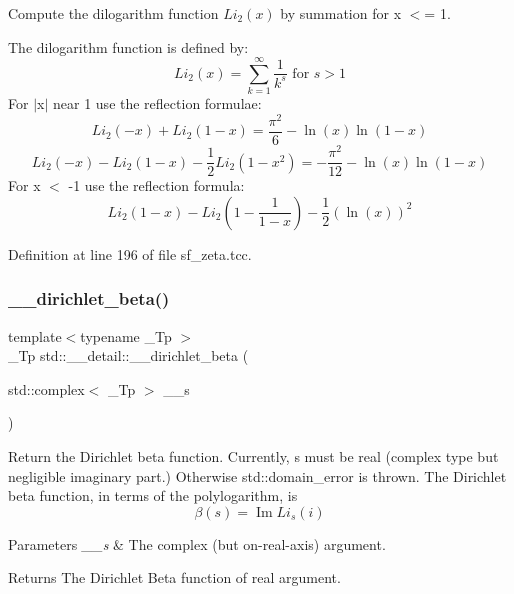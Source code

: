 Compute the dilogarithm function $ Li_2(x) $ by summation for x $<$= 1. 

The dilogarithm function is defined by\+: \[ Li_2(x) = \sum_{k=1}^{\infty} \frac{1}{k^{s}} \mbox{ for } s > 1 \] For $\vert$x$\vert$ near 1 use the reflection formulae\+: \[ Li_2(-x) + Li_2(1-x) = \frac{\pi^2}{6} - \ln(x) \ln(1-x) \] \[ Li_2(-x) - Li_2(1-x) - \frac{1}{2}Li_2(1-x^2) = -\frac{\pi^2}{12} - \ln(x) \ln(1-x) \] For x $<$ -\/1 use the reflection formula\+: \[ Li_2(1-x) - Li_2(1-\frac{1}{1-x}) - \frac{1}{2}(\ln(x))^2 \] 

Definition at line 196 of file sf\+\_\+zeta.\+tcc.

\mbox{\label{namespacestd_1_1____detail_ad0c8e975438d30cbfb5cad91f3ac6d01}} 
\subsubsection{\texorpdfstring{\+\_\+\+\_\+dirichlet\+\_\+beta()}{\_\_dirichlet\_beta()}\hspace{0.1cm}{\footnotesize\ttfamily [1/2]}}
{\footnotesize\ttfamily template$<$typename \+\_\+\+Tp $>$ \\
\+\_\+\+Tp std\+::\+\_\+\+\_\+detail\+::\+\_\+\+\_\+dirichlet\+\_\+beta (\begin{DoxyParamCaption}\item[{std\+::complex$<$ \+\_\+\+Tp $>$}]{\+\_\+\+\_\+s }\end{DoxyParamCaption})}

Return the Dirichlet beta function. Currently, s must be real (complex type but negligible imaginary part.) Otherwise std\+::domain\+\_\+error is thrown. The Dirichlet beta function, in terms of the polylogarithm, is \[ \renewcommand\Re{\operatorname{Re}} \renewcommand\Im{\operatorname{Im}} \beta(s) = \Im{Li_s(i)} \]


\begin{DoxyParams}{Parameters}
{\em \+\_\+\+\_\+s} & The complex (but on-\/real-\/axis) argument. \\
\hline
\end{DoxyParams}
\begin{DoxyReturn}{Returns}
The Dirichlet Beta function of real argument. 
\end{DoxyReturn}


